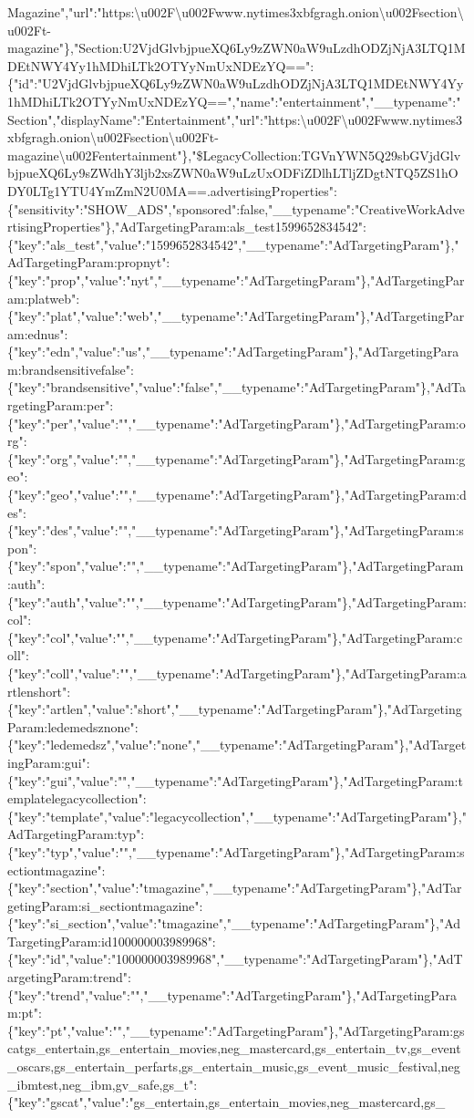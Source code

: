 Magazine","url":"https:\textbackslash{}u002F\textbackslash{}u002Fwww.nytimes3xbfgragh.onion\textbackslash{}u002Fsection\textbackslash{}u002Ft-magazine"\},"Section:U2VjdGlvbjpueXQ6Ly9zZWN0aW9uLzdhODZjNjA3LTQ1MDEtNWY4Yy1hMDhiLTk2OTYyNmUxNDEzYQ==":\{"id":"U2VjdGlvbjpueXQ6Ly9zZWN0aW9uLzdhODZjNjA3LTQ1MDEtNWY4Yy1hMDhiLTk2OTYyNmUxNDEzYQ==","name":"entertainment","\_\_typename":"Section","displayName":"Entertainment","url":"https:\textbackslash{}u002F\textbackslash{}u002Fwww.nytimes3xbfgragh.onion\textbackslash{}u002Fsection\textbackslash{}u002Ft-magazine\textbackslash{}u002Fentertainment"\},"\$LegacyCollection:TGVnYWN5Q29sbGVjdGlvbjpueXQ6Ly9sZWdhY3ljb2xsZWN0aW9uLzUxODFiZDlhLTljZDgtNTQ5ZS1hODY0LTg1YTU4YmZmN2U0MA==.advertisingProperties":\{"sensitivity":"SHOW\_ADS","sponsored":false,"\_\_typename":"CreativeWorkAdvertisingProperties"\},"AdTargetingParam:als\_test1599652834542":\{"key":"als\_test","value":"1599652834542","\_\_typename":"AdTargetingParam"\},"AdTargetingParam:propnyt":\{"key":"prop","value":"nyt","\_\_typename":"AdTargetingParam"\},"AdTargetingParam:platweb":\{"key":"plat","value":"web","\_\_typename":"AdTargetingParam"\},"AdTargetingParam:ednus":\{"key":"edn","value":"us","\_\_typename":"AdTargetingParam"\},"AdTargetingParam:brandsensitivefalse":\{"key":"brandsensitive","value":"false","\_\_typename":"AdTargetingParam"\},"AdTargetingParam:per":\{"key":"per","value":"","\_\_typename":"AdTargetingParam"\},"AdTargetingParam:org":\{"key":"org","value":"","\_\_typename":"AdTargetingParam"\},"AdTargetingParam:geo":\{"key":"geo","value":"","\_\_typename":"AdTargetingParam"\},"AdTargetingParam:des":\{"key":"des","value":"","\_\_typename":"AdTargetingParam"\},"AdTargetingParam:spon":\{"key":"spon","value":"","\_\_typename":"AdTargetingParam"\},"AdTargetingParam:auth":\{"key":"auth","value":"","\_\_typename":"AdTargetingParam"\},"AdTargetingParam:col":\{"key":"col","value":"","\_\_typename":"AdTargetingParam"\},"AdTargetingParam:coll":\{"key":"coll","value":"","\_\_typename":"AdTargetingParam"\},"AdTargetingParam:artlenshort":\{"key":"artlen","value":"short","\_\_typename":"AdTargetingParam"\},"AdTargetingParam:ledemedsznone":\{"key":"ledemedsz","value":"none","\_\_typename":"AdTargetingParam"\},"AdTargetingParam:gui":\{"key":"gui","value":"","\_\_typename":"AdTargetingParam"\},"AdTargetingParam:templatelegacycollection":\{"key":"template","value":"legacycollection","\_\_typename":"AdTargetingParam"\},"AdTargetingParam:typ":\{"key":"typ","value":"","\_\_typename":"AdTargetingParam"\},"AdTargetingParam:sectiontmagazine":\{"key":"section","value":"tmagazine","\_\_typename":"AdTargetingParam"\},"AdTargetingParam:si\_sectiontmagazine":\{"key":"si\_section","value":"tmagazine","\_\_typename":"AdTargetingParam"\},"AdTargetingParam:id100000003989968":\{"key":"id","value":"100000003989968","\_\_typename":"AdTargetingParam"\},"AdTargetingParam:trend":\{"key":"trend","value":"","\_\_typename":"AdTargetingParam"\},"AdTargetingParam:pt":\{"key":"pt","value":"","\_\_typename":"AdTargetingParam"\},"AdTargetingParam:gscatgs\_entertain,gs\_entertain\_movies,neg\_mastercard,gs\_entertain\_tv,gs\_event\_oscars,gs\_entertain\_perfarts,gs\_entertain\_music,gs\_event\_music\_festival,neg\_ibmtest,neg\_ibm,gv\_safe,gs\_t":\{"key":"gscat","value":"gs\_entertain,gs\_entertain\_movies,neg\_mastercard,gs\_